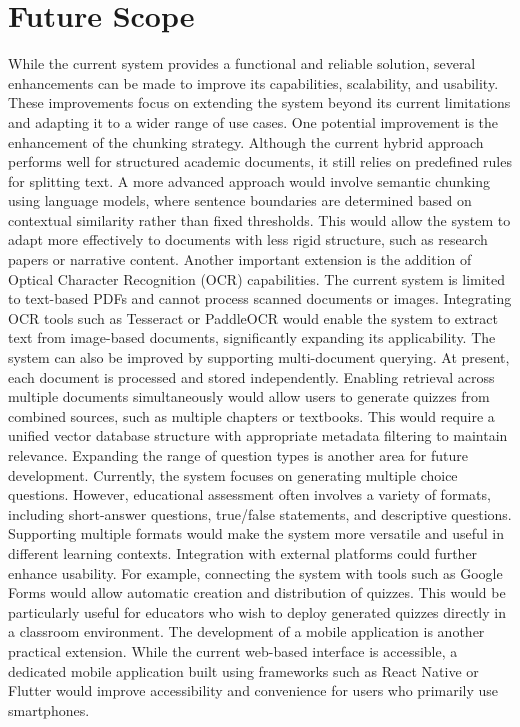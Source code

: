 \documentclass[12pt,a4paper]{report}
\begin{document}
\section{Future Scope}
While the current system provides a functional and reliable solution, several enhancements can be made to improve its capabilities, scalability, and usability. These improvements focus on extending the system beyond its current limitations and adapting it to a wider range of use cases.
One potential improvement is the enhancement of the chunking strategy. Although the current hybrid approach performs well for structured academic documents, it still relies on predefined rules for splitting text. A more advanced approach would involve semantic chunking using language models, where sentence boundaries are determined based on contextual similarity rather than fixed thresholds. This would allow the system to adapt more effectively to documents with less rigid structure, such as research papers or narrative content.
Another important extension is the addition of Optical Character Recognition (OCR) capabilities. The current system is limited to text-based PDFs and cannot process scanned documents or images. Integrating OCR tools such as Tesseract or PaddleOCR would enable the system to extract text from image-based documents, significantly expanding its applicability.
The system can also be improved by supporting multi-document querying. At present, each document is processed and stored independently. Enabling retrieval across multiple documents simultaneously would allow users to generate quizzes from combined sources, such as multiple chapters or textbooks. This would require a unified vector database structure with appropriate metadata filtering to maintain relevance.
Expanding the range of question types is another area for future development. Currently, the system focuses on generating multiple choice questions. However, educational assessment often involves a variety of formats, including short-answer questions, true/false statements, and descriptive questions. Supporting multiple formats would make the system more versatile and useful in different learning contexts.
Integration with external platforms could further enhance usability. For example, connecting the system with tools such as Google Forms would allow automatic creation and distribution of quizzes. This would be particularly useful for educators who wish to deploy generated quizzes directly in a classroom environment.
The development of a mobile application is another practical extension. While the current web-based interface is accessible, a dedicated mobile application built using frameworks such as React Native or Flutter would improve accessibility and convenience for users who primarily use smartphones.
\end{document}
